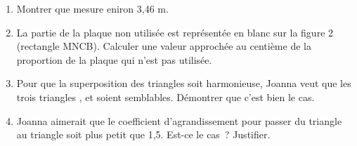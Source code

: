 \documentclass[exercice,a4]{thedocument}%
\begin{document}
    \begin{enumerate}
        \item Montrer que \mathspoint{[AM]} mesure eniron 3,46 m.
        \item La partie de la plaque non utilisée est représentée en blanc
        sur la figure 2 (rectangle MNCB). Calculer une valeur approchée au centième
        de la proportion de la plaque qui n'est pas utilisée.
        \item Pour que la superposition des triangles soit harmonieuse, Joanna veut
        que les trois triangles ,  et 
        soient semblables. Démontrer que c'est bien le cas.
        \item Joanna aimerait que le coefficient d'agrandissement pour passer du triangle
         au triangle  soit plus petit que 1,5. Est-ce
        le cas~? Justifier.
    \end{enumerate}
    \showthesource
\end{document}
